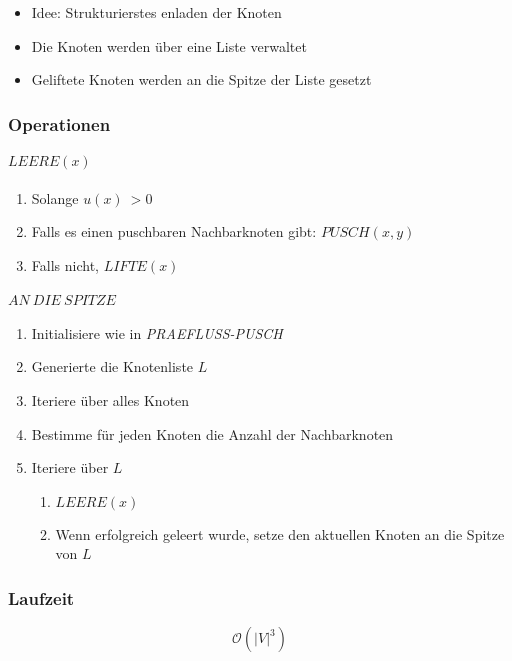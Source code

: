 \begin{itemize}
	\item Idee: Strukturierstes enladen der Knoten
	\item Die Knoten werden über eine Liste verwaltet
	\item Geliftete Knoten werden an die Spitze der Liste gesetzt
\end{itemize}

\subsubsection{Operationen}

\paragraph{\(LEERE(x)\)}
\begin{enumerate}
	\item Solange \(u(x)\ > 0\)
	\item Falls es einen puschbaren Nachbarknoten gibt: \(PUSCH(x,y)\)
	\item Falls nicht, \(LIFTE(x)\)
\end{enumerate}

\paragraph{\(AN~DIE~SPITZE\)}
\begin{enumerate}
	\item Initialisiere wie in \textit{PRAEFLUSS-PUSCH}
	\item Generierte die Knotenliste \(L\)
	\item Iteriere über alles Knoten
	\item Bestimme für jeden Knoten die Anzahl der Nachbarknoten
	\item Iteriere über \(L\)
	\begin{enumerate}
		\item \(LEERE(x)\)
		\item Wenn erfolgreich geleert wurde, setze den aktuellen Knoten an die Spitze von \(L\)
	\end{enumerate}
\end{enumerate}

\subsubsection{Laufzeit}
\[\mathcal{O}(|V|^3)\]



